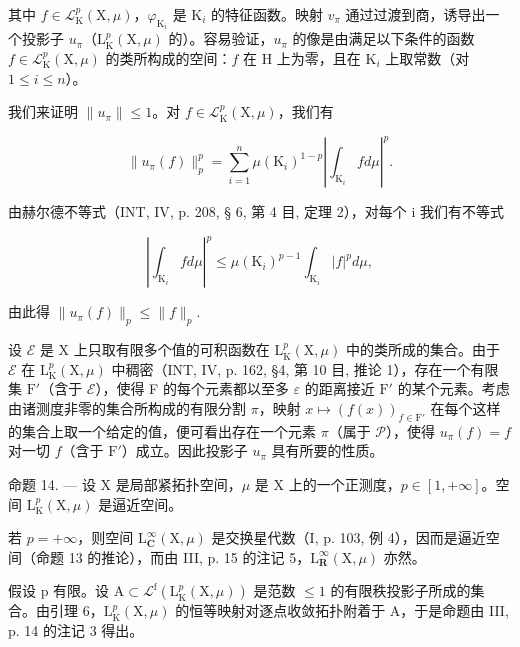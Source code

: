 其中 \(f \in \mathcal{L}_{\mathrm{K}}^{p}(\mathrm{X}, \mu)\)，\(\varphi_{\mathrm{K}_i}\) 是 \(\mathrm{K}_i\) 的特征函数。映射 \(v_\pi\) 通过过渡到商，诱导出一个投影子 \(u_\pi\)（\(\mathrm{L}_{\mathrm{K}}^{p}(\mathrm{X}, \mu)\) 的）。容易验证，\(u_\pi\) 的像是由满足以下条件的函数 \(f \in \mathcal{L}_{\mathrm{K}}^{p}(\mathrm{X}, \mu)\) 的类所构成的空间：\(f\) 在 H 上为零，且在 \(\mathrm{K}_i\) 上取常数（对 \(1 \leqslant i \leqslant n\)）。

我们来证明 \(\| u_{\pi}\| \leqslant 1\)。对 \(f\in \mathcal{L}_{\mathrm{K}}^{p}(\mathrm{X},\mu)\)，我们有

\[
\| u _ {\pi} (f) \| _ {p} ^ {p} = \sum_ {i = 1} ^ {n} \mu (\mathrm{K} _ {i}) ^ {1 - p} \left| \int_ {\mathrm{K} _ {i}} f d \mu \right| ^ {p}.
\]

由赫尔德不等式（INT, IV, p. 208, § 6, 第 4 目, 定理 2），对每个 i 我们有不等式

\[
\left| \int_ {\mathrm{K} _ {i}} f d \mu \right| ^ {p} \leqslant \mu (\mathrm{K} _ {i}) ^ {p - 1} \int_ {\mathrm{K} _ {i}} | f | ^ {p} d \mu ,
\]

由此得 \(\| u_{\pi}(f)\| _p\leqslant \| f\| _p.\)

设 \(\mathcal{E}\) 是 X 上只取有限多个值的可积函数在 \(\mathrm{L}_{\mathrm{K}}^{p}(\mathrm{X},\mu)\) 中的类所成的集合。由于 \(\mathcal{E}\) 在 \(\mathrm{L}_{\mathrm{K}}^{p}(\mathrm{X},\mu)\) 中稠密（INT, IV, p. 162, §4, 第 10 目, 推论 1），存在一个有限集 \(\mathrm{F}'\)（含于 \(\mathcal{E}\)），使得 F 的每个元素都以至多 \(\varepsilon\) 的距离接近 \(\mathrm{F}'\) 的某个元素。考虑由诸测度非零的集合所构成的有限分割 \(\pi\)，映射 \(x\mapsto (f(x))_{f\in \mathrm{F}'}\) 在每个这样的集合上取一个给定的值，便可看出存在一个元素 \(\pi\)（属于 \(\mathcal{P}\)），使得 \(u_{\pi}(f) = f\) 对一切 \(f\)（含于 \(\mathrm{F}'\)）成立。因此投影子 \(u_{\pi}\) 具有所要的性质。

命题 14. --- 设 X 是局部紧拓扑空间，\(\mu\) 是 X 上的一个正测度，\(p \in [1, +\infty]\)。空间 \(\mathrm{L}_{\mathrm{K}}^{p}(\mathrm{X}, \mu)\) 是逼近空间。

若 \(p = +\infty\)，则空间 \(\mathrm{L}_{\mathbf{C}}^{\infty}(\mathrm{X},\mu)\) 是交换星代数（I, p. 103, 例 4），因而是逼近空间（命题 13 的推论），而由 III, p. 15 的注记 5，\(\mathrm{L}_{\mathbf{R}}^{\infty}(\mathrm{X},\mu)\) 亦然。

假设 p 有限。设 \(\mathrm{A}\subset\mathcal{L}^{\mathrm{f}}(\mathrm{L}_{\mathrm{K}}^{p}(\mathrm{X},\mu))\) 是范数 \(\leqslant1\) 的有限秩投影子所成的集合。由引理 6，\(\mathrm{L}_{\mathrm{K}}^{p}(\mathrm{X},\mu)\) 的恒等映射对逐点收敛拓扑附着于 A，于是命题由 III, p. 14 的注记 3 得出。

